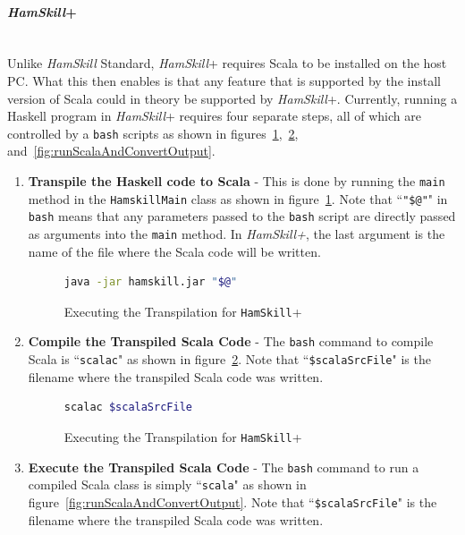 \documentclass{report}
\newcommand{\myparagraph}[1]{\paragraph{#1}\mbox{}\\}
\begin{document}
\myparagraph{\textit{HamSkill}+}

Unlike \textit{HamSkill} Standard, \textit{HamSkill}+ requires Scala to be installed on the host PC.  What this then enables is that any feature that is supported by the install version of Scala could in theory be supported by \textit{HamSkill}+.  Currently, running a Haskell program in \textit{HamSkill}+ requires four separate steps, all of which are controlled by a \texttt{bash} scripts as shown in figures~\ref{fig:runHamskill},~\ref{fig:compileScala}, and~\ref{fig:runScalaAndConvertOutput}.

\begin{enumerate}

\item \textbf{Transpile the Haskell code to Scala} - This is done by running the \texttt{main} method in the \texttt{HamskillMain} class as shown in figure~\ref{fig:runHamskill}.  Note that ``\texttt{"\$@"}" in \texttt{bash} means that any parameters passed to the \texttt{bash} script are directly passed as arguments into the \texttt{main} method.  In \textit{HamSkill+}, the last argument is the name of the file where the Scala code will be written.

\begin{figure}[H]
\begin{mdframed}
\begin{lstlisting}[language=bash]
java -jar hamskill.jar "$@"
\end{lstlisting}
\end{mdframed}
\caption{Executing the Transpilation for \texttt{HamSkill}+}\label{fig:runHamskill}
\end{figure}

\item \textbf{Compile the Transpiled Scala Code} - The \texttt{bash} command to compile Scala is ``\texttt{scalac}" as shown in figure~\ref{fig:compileScala}.  Note that ``\texttt{\$scalaSrcFile}" is the filename where the transpiled Scala code was written.

\begin{figure}[H]
\begin{mdframed}
\begin{lstlisting}[language=bash]
scalac $scalaSrcFile
\end{lstlisting}
\end{mdframed}
\caption{Executing the Transpilation for \texttt{HamSkill}+}\label{fig:compileScala}
\end{figure}

\item \textbf{Execute the Transpiled Scala Code} - The \texttt{bash} command to run a compiled Scala class is simply ``\texttt{scala}" as shown in figure~\ref{fig:runScalaAndConvertOutput}.  Note that ``\texttt{\$scalaSrcFile}" is the filename where the transpiled Scala code was written.


\end{enumerate}
\end{document}
